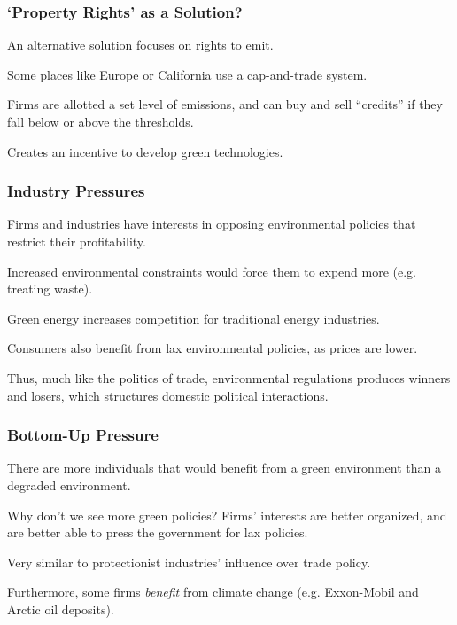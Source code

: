 \documentclass{beamer}
\begin{document}
\begin{frame} 
	\frametitle{\LARGE{`Property Rights' as a Solution?}}
	\begin{itemize}
		\large{
			\item An alternative solution focuses on rights to emit. \pause
			
			\item Some places like Europe or California use a cap-and-trade system. \pause
			
			\item Firms are allotted a set level of emissions, and can buy and sell ``credits'' if they fall below or above the thresholds. \pause
			
			\item Creates an incentive to develop green technologies.
		}
	\end{itemize}
\end{frame}

\begin{frame} 
	\frametitle{\LARGE{Industry Pressures}}
	\begin{itemize}
		\large{
			\item Firms and industries have interests in opposing environmental policies that restrict their profitability. \pause
			
			\item Increased environmental constraints would force them to expend more (e.g. treating waste). \pause
			
			\item Green energy increases competition for traditional energy industries. \pause
			
			\item Consumers also benefit from lax environmental policies, as prices are lower. \pause 
			
			\item Thus, much like the politics of trade, environmental regulations produces winners and losers, which structures domestic political interactions.
		}
	\end{itemize}
\end{frame}

\begin{frame} 
	\frametitle{\LARGE{Bottom-Up Pressure}}
	\begin{itemize}
		\large{
			\item There are more individuals that would benefit from a green environment than a degraded environment. \pause
			
			\item Why don't we see more green policies? \pause Firms' interests are better organized, and are better able to press the government for lax policies. \pause
			
			\item Very similar to protectionist industries' influence over trade policy. \pause
			
			\item Furthermore, some firms \textit{benefit} from climate change (e.g. Exxon-Mobil and Arctic oil deposits). 
			
		}
	\end{itemize}
\end{frame}
\end{document}
